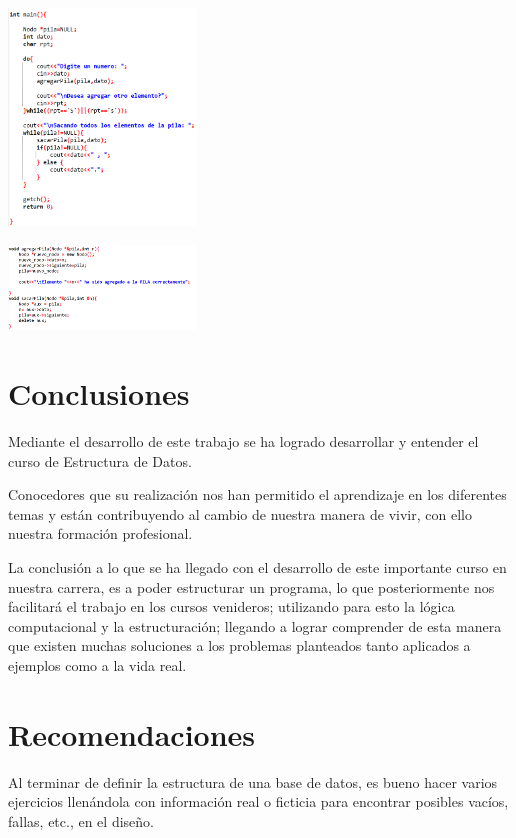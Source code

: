 \documentclass[twoside,twocolumn]{article}
\begin{document}
\begin{center}
	\includegraphics[width=5cm]{./img/8.png} 
\end{center}

\begin{center}
	\includegraphics[width=5cm]{./img/9.png} 
\end{center}

\section{Conclusiones}


Mediante el desarrollo de este trabajo se ha logrado desarrollar y entender el curso de Estructura de Datos.

Conocedores que su realización nos han permitido el aprendizaje en los diferentes temas y están contribuyendo al cambio de nuestra manera de vivir, con ello nuestra formación profesional.

La conclusión a lo que se ha llegado con el desarrollo de este importante curso en nuestra carrera, es a poder estructurar un programa, lo que posteriormente nos facilitará el trabajo en los cursos venideros; utilizando para esto la lógica computacional y la estructuración; llegando a lograr comprender de esta manera que existen muchas soluciones a los problemas planteados tanto aplicados a ejemplos como a la vida real.
\section{Recomendaciones}

Al terminar de definir la estructura de una base de datos, es bueno hacer varios ejercicios llenándola con información real o ficticia para encontrar posibles vacíos, fallas, etc., en el diseño. 
\end{document}
